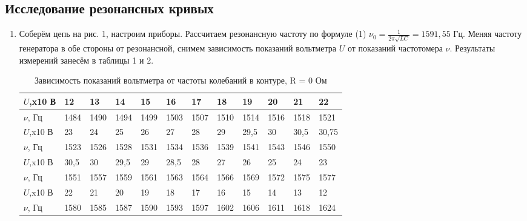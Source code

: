 \documentclass[a4paper]{article}
\begin{document}
\subsection{Исследование резонансных кривых}
\begin{enumerate}
    \item Соберём цепь на рис. 1, настроим приборы. Рассчитаем резонансную частоту по формуле (1) $ \nu_0 = \frac{1}{2\pi \sqrt{LC}} = 1591,55$ Гц. Меняя частоту генератора в обе стороны от резонансной, снимем зависимость показаний вольтметра $U$ от показаний частотомера $\nu$. Результаты измерений занесём в таблицы 1 и 2.
    
        \begin{table}[h]
    \centering
    \begin{center}
    \caption{Зависимость показаний вольтметра от частоты колебаний в контуре, R = 0 Ом}
    \end{center}
    \vspace{0.1cm}
    \label{tab:my_label}
    \begin{tabular}{ |p{1.5cm}||p{0.7cm}|p{0.7cm}|p{0.7cm}|p{0.7cm}|p{0.7cm}|p{0.7cm}|p{0.7cm}|p{0.7cm}|p{0.7cm}|p{0.7cm}|p{0.7cm}|  }
 \hline
 $U$,x10 В  & 12 & 13 & 14 & 15 & 16 & 17 & 18 & 19 & 20 & 21 & 22   \\
\hline 
 $\nu$, Гц & 1484 & 1490 & 1494 & 1499 & 1503 & 1507 & 1510 & 1514 & 1516 & 1518 & 1521 \\
 \hline
 \hline
 
  $U$,x10 В  & 23 & 24 & 25 & 26 & 27 & 28 & 29 & 29,5 & 30 & 30,5 & 30,75   \\
\hline 
 $\nu$, Гц & 1523 & 1526 & 1528 & 1531 & 1534 & 1536 & 1539 & 1541 & 1543 & 1546 & 1550 \\
 \hline
 \hline
 
  $U$,x10 В  & 30,5 & 30 & 29,5 & 29 & 28,5 & 28 & 27 & 26 & 25 & 24 & 23   \\
\hline 
 $\nu$, Гц & 1551 & 1557 & 1559 & 1561 & 1563 & 1564 & 1566 & 1569 & 1572 & 1575 & 1577 \\
 \hline
 \hline
 
  $U$,x10 В  & 22 & 21 & 20 & 19 & 18 & 17 & 16 & 15 & 14 & 13 & 12   \\
\hline 
 $\nu$, Гц & 1580 & 1585 & 1587 & 1590 & 1593 & 1597 & 1602 & 1606 & 1611 & 1618 & 1624 \\

 \hline
\end{tabular}
\end{table}


\end{enumerate}
\end{document}
